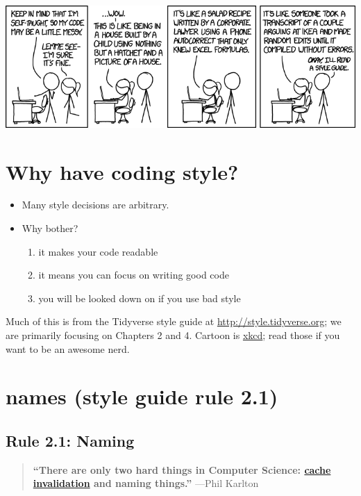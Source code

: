 \documentclass[
  letterpaper,
  DIV=11,
  numbers=noendperiod]{scrreprt}
\providecommand{\tightlist}{%
  \setlength{\itemsep}{0pt}\setlength{\parskip}{0pt}}\usepackage{longtable,booktabs,array}
\begin{document}
\includegraphics[width=1\textwidth,height=\textheight]{image/code_quality.png}

\hypertarget{why-have-coding-style}{%
\section{Why have coding style?}\label{why-have-coding-style}}

\begin{itemize}
\tightlist
\item
  Many style decisions are arbitrary.
\item
  Why bother?

  \begin{enumerate}
  \def\labelenumi{\arabic{enumi}.}
  \tightlist
  \item
    it makes your code readable
  \item
    it means you can focus on writing good code
  \item
    you will be looked down on if you use bad style
  \end{enumerate}
\end{itemize}

Much of this is from the Tidyverse style guide at
\url{http://style.tidyverse.org}; we are primarily focusing on Chapters
2 and 4. Cartoon is \href{https://xkcd.com/}{xkcd}; read those if you
want to be an awesome nerd.

\hypertarget{names-style-guide-rule-2.1}{%
\section{names (style guide rule
2.1)}\label{names-style-guide-rule-2.1}}

\hypertarget{rule-2.1-naming}{%
\subsection{Rule 2.1: Naming}\label{rule-2.1-naming}}

\begin{quote}
\textbf{``There are only two hard things in Computer Science:
\href{https://en.wikipedia.org/wiki/Cache_invalidation}{cache
invalidation} and naming things.''} ---Phil Karlton
\end{quote}
\end{document}
